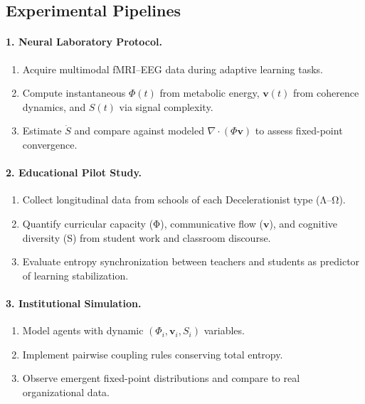 \documentclass[12pt,a4paper]{article}
\begin{document}
\subsection{Experimental Pipelines}

\paragraph{1. Neural Laboratory Protocol.}
\begin{enumerate}[leftmargin=1.2em]
  \item Acquire multimodal fMRI–EEG data during adaptive learning tasks.
  \item Compute instantaneous $\Phi(t)$ from metabolic energy, $\mathbf{v}(t)$ from coherence dynamics, and $S(t)$ via signal complexity.
  \item Estimate $\dot S$ and compare against modeled $\nabla\!\cdot(\Phi\mathbf{v})$ to assess fixed-point convergence.
\end{enumerate}

\paragraph{2. Educational Pilot Study.}
\begin{enumerate}[leftmargin=1.2em]
  \item Collect longitudinal data from schools of each Decelerationist type (Λ–Ω).
  \item Quantify curricular capacity (Φ), communicative flow ($\mathbf{v}$), and cognitive diversity (S) from student work and classroom discourse.
  \item Evaluate entropy synchronization between teachers and students as predictor of learning stabilization.
\end{enumerate}

\paragraph{3. Institutional Simulation.}
\begin{enumerate}[leftmargin=1.2em]
  \item Model agents with dynamic $(Φ_i, \mathbf{v}_i, S_i)$ variables.
  \item Implement pairwise coupling rules conserving total entropy.
  \item Observe emergent fixed-point distributions and compare to real organizational data.
\end{enumerate}
\end{document}
